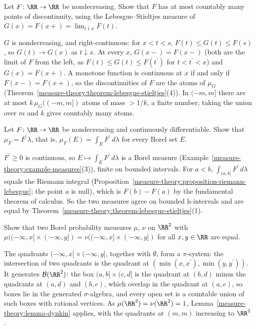 \begin{exercise}\label{measure-theory:exercise-monotone-discontinuities}
Let $F \colon \RR \to \RR$ be nondecreasing. Show that $F$ has at most countably many points of discontinuity, using the Lebesgue--Stieltjes measure of $G(x) = F(x+) = \lim_{t \downarrow x}F(t)$.
\end{exercise}

\begin{solution}
$G$ is nondecreasing, and right-continuous: for $x < t < s$, $F(t) \leq G(t) \leq F(s)$, so $G(t) \to G(x)$ as $t \downarrow x$. At every $x$, $G(x-) = F(x-)$ (both are the limit of $F$ from the
left, as $F(t) \leq G(t) \leq F(t^{\prime})$ for $t < t^{\prime} < x$) and $G(x) = F(x+)$. A monotone function is continuous at $x$ if and only if $F(x-) = F(x+)$, so the discontinuities of $F$ are the
atoms of $\mu_G$ (Theorem~\ref{measure-theory:theorem-lebesgue-stieltjes}(4)). In $(-m, m]$ there are at most $k\,\mu_G((-m, m])$ atoms of mass $> 1/k$, a finite number; taking the union over $m$ and $k$
gives countably many atoms.
\end{solution}

\begin{exercise}\label{measure-theory:exercise-stieltjes-density}
Let $F \colon \RR \to \RR$ be nondecreasing and continuously differentiable. Show that $\mu_F = F^{\prime}\lambda$, that is, $\mu_F(E) = \int_EF^{\prime}\,d\lambda$ for every Borel set $E$.
\end{exercise}

\begin{solution}
$F^{\prime} \geq 0$ is continuous, so $E \mapsto \int_EF^{\prime}\,d\lambda$ is a Borel measure (Example~\ref{measure-theory:example-measures}(3)), finite on bounded intervals. For $a < b$,
$\int_{(a, b]}F^{\prime}\,d\lambda$ equals the Riemann integral (Proposition~\ref{measure-theory:proposition-riemann-lebesgue}; the point $a$ is null), which is $F(b) - F(a)$ by the fundamental theorem
of calculus. So the two measures agree on bounded h-intervals and are equal by Theorem~\ref{measure-theory:theorem-lebesgue-stieltjes}(1).
\end{solution}

\begin{exercise}\label{measure-theory:exercise-quadrants}
Show that two Borel probability measures $\mu$, $\nu$ on $\RR^2$ with $\mu((-\infty, x] \times (-\infty, y]) = \nu((-\infty, x] \times (-\infty, y])$ for all $x, y \in \RR$ are equal.
\end{exercise}

\begin{solution}
The quadrants $(-\infty, x] \times (-\infty, y]$, together with $\emptyset$, form a $\pi$-system: the intersection of two quadrants is the quadrant at $(\min(x, x^{\prime}), \min(y, y^{\prime}))$. It generates
$\mathcal{B}(\RR^2)$: the box $(a, b] \times (c, d]$ is the quadrant at $(b, d)$ minus the quadrants at $(a, d)$ and $(b, c)$, which overlap in the quadrant at $(a, c)$, so boxes lie in the generated
$\sigma$-algebra, and every open set is a countable union of such boxes with rational vertices. As $\mu(\RR^2) = \nu(\RR^2) = 1$, Lemma~\ref{measure-theory:lemma-dynkin} applies, with the quadrants at
$(m, m)$ increasing to $\RR^2$.
\end{solution}
